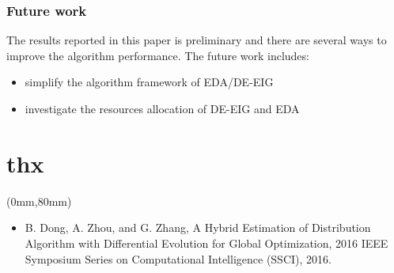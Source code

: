 \documentclass[xcolor=dvipsnames]{beamer}
\newenvironment{reference}[2]{%
  \begin{textblock*}{\textwidth}(#1,#2)
     \bgroup\fontsize{6pt}{\baselineskip}\selectfont\color[RGB]{0,112,192}}{\egroup\end{textblock*}}
\begin{document}
    \begin{frame}
    \frametitle{Future work}
    The results reported in this paper is preliminary and there are several ways to improve the algorithm performance. The future work includes:
    \begin{itemize}
    \item simplify the algorithm framework of EDA/DE-EIG
    \item investigate the resources allocation of DE-EIG and EDA
    \end{itemize}
    \end{frame}


    \section*{thx}
        \begin{frame}
        \begin{center}
        \fontsize{60pt}{\baselineskip}\selectfont {}
        \end{center}
        \begin{reference}{0mm}{80mm}
        \begin{itemize}
        \item  B. Dong, A. Zhou, and G. Zhang, A Hybrid Estimation of Distribution Algorithm with Differential Evolution for Global Optimization, 2016 IEEE Symposium Series on Computational Intelligence (SSCI), 2016.
        \end{itemize}
        \end{reference}
        \end{frame}
\end{document}
